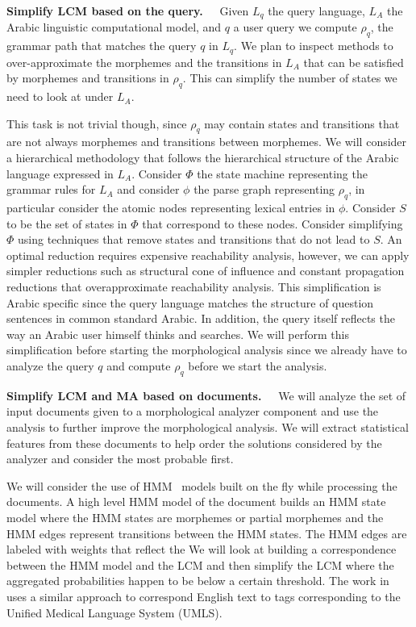 \documentclass[12pt]{article}
\begin{document}
{\bf Simplify LCM based on the query.~~}
Given $L_q$ the query language, 
$L_A$ the Arabic linguistic
computational model, and  $q$ a user query
we compute $\rho_q$, the grammar path that matches 
the query $q$ in $L_q$. 
We plan to inspect methods to over-approximate 
the morphemes and the transitions in $L_A$ 
that can be satisfied by morphemes and transitions
in $\rho_q$. 
This can simplify the number of states we need to 
look at under $L_A$. 

This task is not trivial though, since $\rho_q$ may contain
states and transitions that are not always morphemes and 
transitions between morphemes. 
We will consider a hierarchical methodology that follows 
the hierarchical structure of the Arabic language expressed
in $L_A$. 
Consider $\Phi$ the state machine representing the grammar 
rules for $L_A$ and consider $\phi$ the parse graph 
representing $\rho_q$, in particular consider the atomic nodes 
representing lexical entries in $\phi$. 
Consider $S$ to be the set of states in $\Phi$ that 
correspond to these nodes. 
Consider simplifying $\Phi$ using techniques that remove 
states and transitions that do not lead to $S$. 
An optimal reduction requires expensive reachability 
analysis, however, we can apply simpler reductions such 
as structural cone of influence and
constant propagation reductions that overapproximate
reachability analysis. 
This simplification is Arabic specific since
the query language matches the structure of question sentences 
in common standard Arabic.
In addition, the query itself reflects the way an Arabic user
himself thinks and searches. 
We will perform this simplification before starting the 
morphological analysis since we already have to analyze
the query $q$ and compute $\rho_q$ before we start
the analysis. 

{\bf Simplify LCM and MA based on documents.~~}
We will analyze the set of input documents given to a
morphological analyzer component and use the analysis
to further improve the morphological analysis. 
We will extract statistical features from these documents 
to help order the solutions considered by the analyzer
and consider the most probable first. 

We will consider the use of HMM~\cite{JanHMM06}
models built on the fly while processing the documents.
A high level HMM model of the document builds an HMM state
model where the HMM states are morphemes or partial 
morphemes and the HMM edges represent transitions between
the HMM states. 
The HMM edges are labeled with weights that reflect the
We will look at building a correspondence between 
the HMM model and the LCM and then simplify the 
LCM where the aggregated probabilities happen to be
below a certain threshold. 
The work in~\cite{JanHMM06} uses a similar approach
to correspond English text to tags corresponding to the 
Unified Medical Language System (UMLS).
\end{document}
